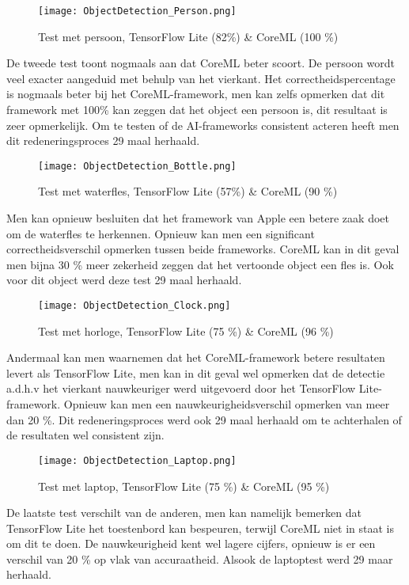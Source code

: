 \begin{figure}[H]
	\centering
	\texttt{[image: ObjectDetection\_Person.png]}
	\caption{Test met persoon, TensorFlow Lite (82\%) \& CoreML (100 \%)}
\end{figure}
De tweede test toont nogmaals aan dat CoreML beter scoort. De persoon wordt veel exacter aangeduid met behulp van het vierkant. Het correctheidspercentage is nogmaals beter bij het CoreML-framework, men kan zelfs opmerken dat dit framework met 100\% kan zeggen dat het object een persoon is, dit resultaat is zeer opmerkelijk. Om te testen of de AI-frameworks consistent acteren heeft men dit redeneringsproces 29 maal herhaald.

\begin{figure}[H]
	\centering
	\texttt{[image: ObjectDetection\_Bottle.png]}
	\caption{Test met waterfles, TensorFlow Lite (57\%) \& CoreML (90 \%)}
\end{figure}
Men kan opnieuw besluiten dat het framework van Apple een betere zaak doet om de waterfles te herkennen. Opnieuw kan men een significant correctheidsverschil opmerken tussen beide frameworks. CoreML kan in dit geval men bijna 30 \% meer zekerheid zeggen dat het vertoonde object een fles is. Ook voor dit object werd deze test 29 maal herhaald.
\begin{figure}[H]
	\centering
	\texttt{[image: ObjectDetection\_Clock.png]}
	\caption{Test met horloge, TensorFlow Lite (75 \%) \& CoreML (96 \%)}
\end{figure}
Andermaal kan men waarnemen dat het CoreML-framework betere resultaten levert als TensorFlow Lite, men kan in dit geval wel opmerken dat de detectie a.d.h.v het vierkant nauwkeuriger werd uitgevoerd door het TensorFlow Lite-framework. Opnieuw kan men een nauwkeurigheidsverschil opmerken van meer dan 20 \%. Dit redeneringsproces werd ook 29 maal herhaald om te achterhalen of de resultaten wel consistent zijn.

\begin{figure}[H]
	\centering
	\texttt{[image: ObjectDetection\_Laptop.png]}
	\caption{Test met laptop, TensorFlow Lite (75 \%) \& CoreML (95 \%)}
\end{figure}
De laatste test verschilt van de anderen, men kan namelijk bemerken dat TensorFlow Lite het toestenbord kan bespeuren, terwijl CoreML niet in staat is om dit te doen. De nauwkeurigheid kent wel lagere cijfers, opnieuw is er een verschil van 20 \% op vlak van accuraatheid. Alsook de laptoptest werd 29 maar herhaald. 
	

